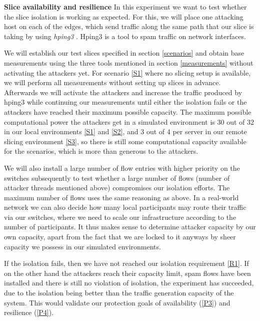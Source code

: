 \begin{description}[style=multiline, labelwidth=0.7cm]
    \item[\namedlabel{E1}{E1}] \textbf{Slice availability and resilience} In this experiment we want to test whether the slice isolation is working as expected. For this, we will place one attacking host on each of the edges, which send traffic along the same path that our slice is taking by using \textit{hping3} \cite{hping3}. Hping3 is a tool to spam traffic on network interfaces.

    We will establish our test slices specified in section \ref{scenarios} and obtain base measurements using the three tools mentioned in section \ref{measurements} without activating the attackers yet. For scenario \ref{S1} where no slicing setup is available, we will perform all measurements without setting up slices in advance. Afterwards we will activate the attackers and increase the traffic produced by hping3 while continuing our measurements until either the isolation fails or the attackers have reached their maximum possible capacity. The maximum possible computational power the attackers get in a simulated environment is 30 out of 32 in our local environments \ref{S1} and \ref{S2}, and 3 out of 4 per server in our remote slicing environment \ref{S3}, so there is still some computational capacity available for the scenarios, which is more than generous to the attackers.

    We will also install a large number of flow entries with higher priority on the switches subsequently to test whether a large number of flows (number of attacker threads mentioned above) compromises our isolation efforts. The maximum number of flows uses the same reasoning as above. In a real-world network we can also decide how many local participants may route their traffic via our switches, where we need to scale our infrastructure according to the number of participants. It thus makes sense to determine attacker capacity by our own capacity, apart from the fact that we are locked to it anyways by sheer capacity we possess in our simulated environments.

    If the isolation fails, then we have not reached our isolation requirement \ref{R1}. If on the other hand the attackers reach their capacity limit, spam flows have been installed and there is still no violation of isolation, the experiment has succeeded, due to the isolation being better than the traffic generation capacity of the system. This would validate our protection goals of availability (\ref{P3}) and resilience (\ref{P4}).


\end{description}
